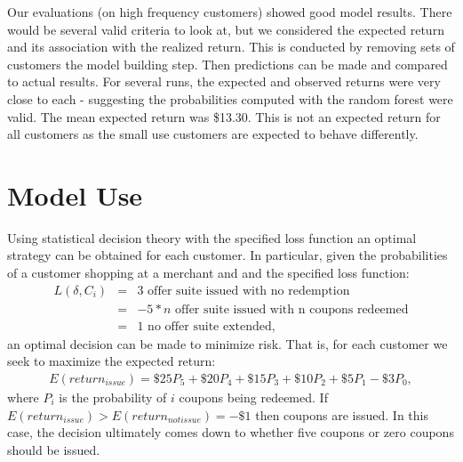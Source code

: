 \documentclass[12pt]{article} %
\begin{document}
Our evaluations (on high frequency customers) showed good model results.  There would be several valid criteria to look at, but we considered the expected return and its association with the realized return.  This is conducted by removing sets of customers the model building step.  Then predictions can be made and compared to actual results.  For several runs, the expected and observed returns were very close to each - suggesting the probabilities computed with the random forest were valid.  The mean expected return was \$13.30.  This is not an expected return for all customers as the small use customers are expected to behave differently.
 
\section{Model Use}
Using statistical decision theory with the specified loss function an optimal strategy can be obtained for each customer.
In particular, given the probabilities of a customer shopping at a merchant and and the specified loss function:  
\begin{eqnarray*}
L(\delta,C_i) &=& 3 \text {  offer suite issued with no redemption}\\
&=& -5 * n \text{  offer suite issued with n coupons redeemed}\\
&=& 1 \text{  no offer suite extended},
\end{eqnarray*}
an optimal decision can be made to minimize risk.  That is, for each customer we seek to maximize the expected return:
\begin{eqnarray}
E(return_{issue}) = \$25 P_5 + \$20 P_4 + \$15 P_3 +\$10 P_2 +\$5 P_1 - \$3 P_0,
\end{eqnarray}
where $P_i$ is the probability of $i$ coupons being redeemed.  If $E(return_{issue}) > E(return_{notissue}) =-\$1$ then coupons are issued.  In this case, the decision ultimately comes down to whether five coupons or zero coupons should be issued.
\end{document}
